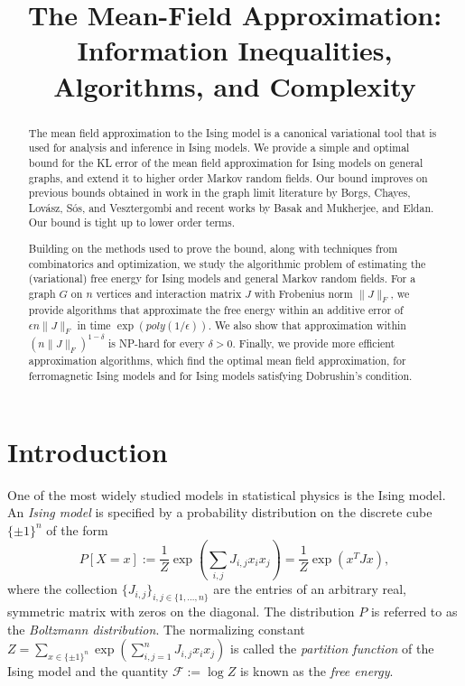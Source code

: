 \documentclass[final, 12pt]{colt2018}
\title{The Mean-Field Approximation: Information Inequalities, Algorithms, and Complexity}
\newcommand{\F}{\mathcal{F}}
\theoremstyle{definition}
\theoremstyle{plain}
\begin{document}
\maketitle

\begin{abstract}
The mean field approximation to the Ising model is a canonical variational tool that is used for analysis and inference in Ising models. We provide a simple and optimal bound for the KL error of the mean field approximation for Ising models on general graphs, and extend it to higher order Markov random fields. Our bound improves on previous bounds obtained in work in the graph limit literature by Borgs, Chayes, Lov{\'a}sz, S{\'o}s, and Vesztergombi and recent works by Basak and Mukherjee, and Eldan. Our bound is tight up to lower order terms. 

Building on the methods used to prove the bound, along with techniques from combinatorics and optimization, 
we study the algorithmic problem of estimating the (variational) free energy for Ising models and general Markov random fields. For a graph $G$ on $n$ vertices and interaction matrix $J$ with Frobenius norm $\| J \|_F$, we provide algorithms that approximate the free energy within an additive error of $\epsilon n \|J\|_F$ in time $\exp(poly(1/\epsilon))$. We also show that approximation within $(n \|J\|_F)^{1-\delta}$ is NP-hard for every $\delta > 0$. Finally, we provide more efficient approximation algorithms,
which find the optimal mean field approximation, for ferromagnetic Ising models and for Ising models satisfying Dobrushin's condition.  
\end{abstract}

\section{Introduction}
One of the most widely studied models in statistical physics is the Ising model. An \emph{Ising model} is specified by
a probability distribution on the discrete cube $\{\pm1\}^n$ of the form
\[ P[X = x] := \frac{1}{Z} \exp(\sum_{i,j} J_{i,j} x_i x_j) = \frac{1}{Z} \exp(x^T J x), \]
where the collection $\{J_{i,j}\}_{i,j\in\{1,\dots,n\}}$ are the entries of
an arbitrary real, symmetric matrix with zeros on the diagonal. The distribution $P$ is referred to as the \emph{Boltzmann distribution}. The normalizing constant $Z=\sum_{x\in\{\pm1\}^{n}}\exp(\sum_{i,j=1}^{n}J_{i,j}x_{i}x_{j})$
is called the \emph{partition function }of the Ising model and the quantity $\F := \log{Z}$ is known as the \emph{free energy}. 
\end{document}
